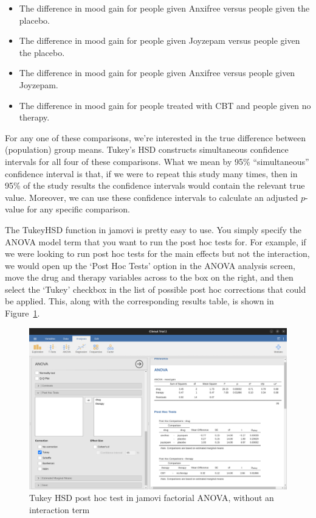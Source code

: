\documentclass[
  a4paper,
]{book}
\providecommand{\tightlist}{%
  \setlength{\itemsep}{0pt}\setlength{\parskip}{0pt}}\usepackage{longtable,booktabs,array}
\begin{document}
\begin{itemize}
\tightlist
\item
  The difference in mood gain for people given Anxifree versus people
  given the placebo.
\item
  The difference in mood gain for people given Joyzepam versus people
  given the placebo.
\item
  The difference in mood gain for people given Anxifree versus people
  given Joyzepam.
\item
  The difference in mood gain for people treated with CBT and people
  given no therapy.
\end{itemize}

For any one of these comparisons, we're interested in the true
difference between (population) group means. Tukey's HSD constructs
simultaneous confidence intervals for all four of these comparisons.
What we mean by 95\% ``simultaneous'' confidence interval is that, if we
were to repeat this study many times, then in 95\% of the study results
the confidence intervals would contain the relevant true value.
Moreover, we can use these confidence intervals to calculate an adjusted
\(p\)-value for any specific comparison.

The TukeyHSD function in jamovi is pretty easy to use. You simply
specify the ANOVA model term that you want to run the post hoc tests
for. For example, if we were looking to run post hoc tests for the main
effects but not the interaction, we would open up the `Post Hoc Tests'
option in the ANOVA analysis screen, move the drug and therapy variables
across to the box on the right, and then select the `Tukey' checkbox in
the list of possible post hoc corrections that could be applied. This,
along with the corresponding results table, is shown in
Figure~\ref{fig-fig14-24}.

\begin{figure}

\includegraphics[width=1\textwidth,height=\textheight]{images/fig14-24.png} \hfill{}

\caption{\label{fig-fig14-24}Tukey HSD post hoc test in jamovi factorial
ANOVA, without an interaction term}

\end{figure}
\end{document}
